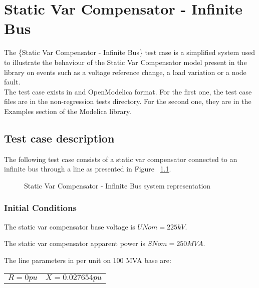 \documentclass[a4paper, 12pt]{report}
\begin{document}
\chapter{Static Var Compensator - Infinite Bus}

The \{Static Var Compensator - Infinite Bus\} test case is a simplified system used to illustrate the behaviour of the Static Var Compensator model present in the \Dynawo library on events such as a voltage reference change, a load variation or a node fault.\\

The test case exists in \Dynawo and OpenModelica format. For the first one, the test case files are in the non-regression tests directory. For the second one, they are in the Examples section of the \Dynawo Modelica library.

\section{Test case description}

The following test case consists of a static var compensator connected to an infinite bus through a line as presented in Figure ~\ref{TestCase}.

\begin{figure}[H]
\centering
\def\factor{0.4}
\caption{Static Var Compensator - Infinite Bus system representation}
\label{TestCase}
\end{figure}

\subsection{Initial Conditions}

The static var compensator base voltage is $UNom = 225 kV$.

The static var compensator apparent power is $SNom = 250 MVA$.

The line parameters in per unit on 100 MVA base are:
\begin{center}
\begin{tabular}{l|l}
   $R = 0 pu$ & $X = 0.027654 pu$  \\
\end{tabular}
\end{center}
\end{document}
